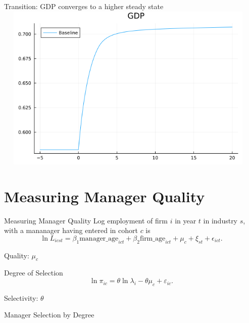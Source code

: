 \documentclass[
  ignorenonframetext,
  aspectratio=1610,
]{beamer}
\let\oldsection\section
\renewcommand{\section}{
  \addtocounter{framenumber}{-1} %
  \oldsection
}
\begin{document}
\begin{frame}{Transition: GDP converges to a higher steady state}
\protect\hypertarget{transition-gdp-converges-to-a-higher-steady-state}{}
\includegraphics[width=13cm,height=8cm]{fig/model-gdp-liberalization.png}
\end{frame}

\section{Measuring Manager Quality}\label{measuring-manager-quality}

\begin{frame}{Measuring Manager Quality}
\protect\hypertarget{measuring-manager-quality-1}{}
Log employment of firm \(i\) in year \(t\) in industry \(s\), with a
mananager having entered in cohort \(c\) is \[
\ln L_{icst} = \beta_1\text{manager\_age}_{ict} + \beta_2\text{firm\_age}_{ict}  + \mu_{c} + \xi_{st} + \epsilon_{ict}.
\]

Quality: \(\mu_c\)
\end{frame}

\begin{frame}{Degree of Selection}
\protect\hypertarget{degree-of-selection}{}
\[
\ln \pi_{ic} = \theta\ln\lambda_i  - \theta \mu_c + \varepsilon_{ic}.
\]

Selectivity: \(\theta\)
\end{frame}

\begin{frame}{Manager Selection by Degree}
\protect\hypertarget{manager-selection-by-degree}{}

\end{frame}
\end{document}
